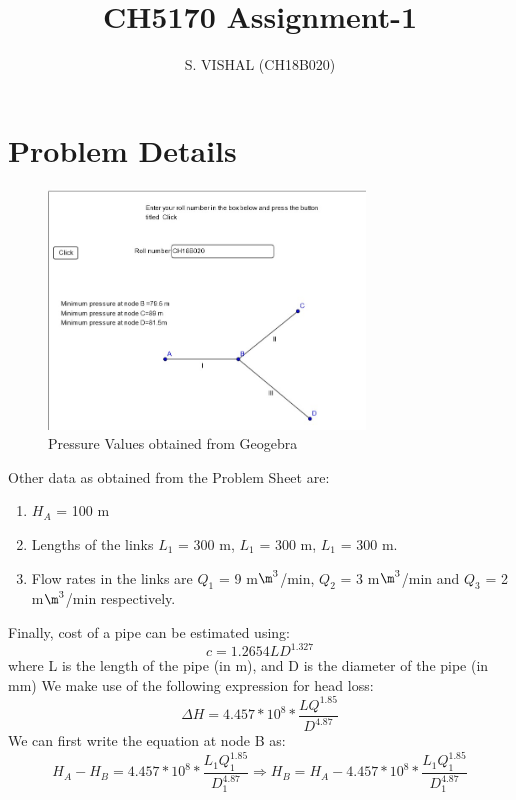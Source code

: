 \documentclass{homework}
\title{CH5170 Assignment-1}
\author{S. VISHAL (CH18B020)}
\begin{document}
\maketitle
\section{Problem Details}
\begin{figure}[ht]
\centering
\includegraphics[width=0.75\textwidth]{question.jpg}
\caption{Pressure Values obtained from Geogebra}
\end{figure}
Other data as obtained from the Problem Sheet are:
\begin{enumerate}
\item $H_A$ = 100 m
\item Lengths of the links $L_{1}$ = 300 m, $L_{1}$ = 300 m, $L_{1}$ = 300 m. \item Flow rates in the links are $Q_1$ = 9 m$\m^3$/min, $Q_2$ = 3 m$\m^3$/min and $Q_3$ = 2 m$\m^3$/min respectively.
\end{enumerate}
Finally, cost of a pipe can be estimated using:
\begin{equation}\label{pipe_cost}
c = 1.2654LD^{1.327}
\end{equation}
where L is the length of the pipe (in m), and D is the diameter of the pipe (in mm)
We make use of the following expression for head loss:
\begin{equation}\label{head_loss}
\Delta H = 4.457*10^8*\frac{LQ^{1.85}}{D^{4.87}}
\end{equation}
We can first write the equation at node B as:
\begin{equation}\label{node_B_Pressure}
H_A - H_B = 4.457*10^8*\frac{L_1Q_1^{1.85}}{D_1^{4.87}}
\Rightarrow{H_B = H_A - 4.457*10^8*\frac{L_1Q_1^{1.85}}{D_1^{4.87}}}
\end{equation}
\end{document}
